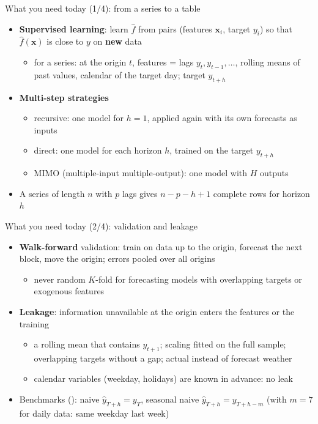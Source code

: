 \begin{frame}{What you need today (1/4): from a series to a table}
\itemsize{\small}
\begin{itemize}
    \item \textbf{Supervised learning}: learn $\hat f$ from pairs (features $\mathbf{x}_i$, target $y_i$) so that $\hat f(\mathbf{x})$ is close to $y$ on \textbf{new} data
    \begin{itemize}
        \item for a series: at the origin $t$, features = lags $y_t, y_{t-1}, \dots$, rolling means of past values, calendar of the target day; target $y_{t+h}$
    \end{itemize}
    \item \textbf{Multi-step strategies}
    \begin{itemize}
        \item recursive: one model for $h = 1$, applied again with its own forecasts as inputs
        \item direct: one model for each horizon $h$, trained on the target $y_{t+h}$
        \item MIMO (multiple-input multiple-output): one model with $H$ outputs
    \end{itemize}
    \item A series of length $n$ with $p$ lags gives $n - p - h + 1$ complete rows for horizon $h$
\end{itemize}
\end{frame}

\begin{frame}{What you need today (2/4): validation and leakage}
\itemsize{\small}
\begin{itemize}
    \item \textbf{Walk-forward} validation: train on data up to the origin, forecast the next block, move the origin; errors pooled over all origins
    \begin{itemize}
        \item never random $K$-fold for forecasting models with overlapping targets or exogenous features
    \end{itemize}
    \item \textbf{Leakage}: information unavailable at the origin enters the features or the training
    \begin{itemize}
        \item a rolling mean that contains $y_{t+1}$; scaling fitted on the full sample; overlapping targets without a gap; actual instead of forecast weather
        \item calendar variables (weekday, holidays) are known in advance: no leak
    \end{itemize}
    \item Benchmarks (): naive $\hat y_{T+h} = y_T$, seasonal naive $\hat y_{T+h} = y_{T+h-m}$ (with $m = 7$ for daily data: same weekday last week)
\end{itemize}
\end{frame}

